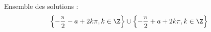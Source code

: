 Ensemble des solutions :
\begin{displaymath}
  \left\lbrace -\frac{\pi}{2} - a +2k\pi, k\in \Z\right\rbrace \cup  \left\lbrace -\frac{\pi}{2} + a +2k\pi, k\in \Z\right\rbrace
\end{displaymath}

